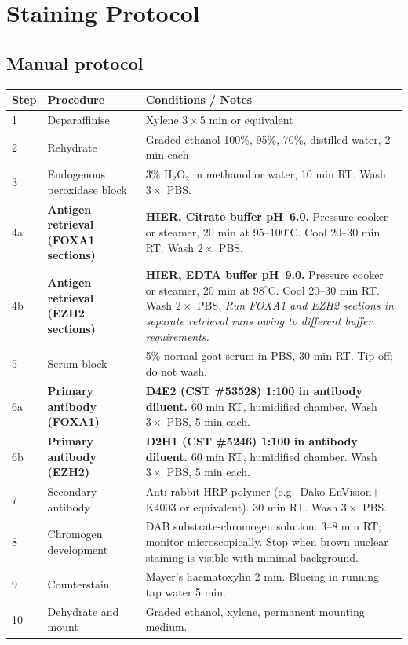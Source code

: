 \documentclass[11pt, a4paper]{article}
\begin{document}
\section{Staining Protocol}

\subsection{Manual protocol}

\begin{center}
\begin{tabular}{p{0.7cm}p{4.8cm}p{8cm}}
\toprule
\textbf{Step} & \textbf{Procedure} &
\textbf{Conditions / Notes} \\
\midrule
1 & Deparaffinise &
Xylene $3\times5$ min or equivalent \\[0.3em]
2 & Rehydrate &
Graded ethanol 100\%, 95\%, 70\%,
distilled water, 2 min each \\[0.3em]
3 & Endogenous peroxidase block &
3\% H$_2$O$_2$ in methanol or water,
10 min RT. Wash $3\times$ PBS. \\[0.3em]
4a & \textbf{Antigen retrieval
(FOXA1 sections)} &
\textbf{HIER, Citrate buffer pH~6.0.}
Pressure cooker or steamer,
20 min at $95$--$100^\circ$C.
Cool 20--30 min RT.
Wash $2\times$ PBS.\\[0.3em]
4b & \textbf{Antigen retrieval
(EZH2 sections)} &
\textbf{HIER, EDTA buffer pH~9.0.}
Pressure cooker or steamer,
20 min at $98^\circ$C.
Cool 20--30 min RT.
Wash $2\times$ PBS.
\textit{Run FOXA1 and EZH2 sections
in separate retrieval runs owing
to different buffer requirements.}\\[0.3em]
5 & Serum block &
5\% normal goat serum in PBS,
30 min RT. Tip off; do not wash.\\[0.3em]
6a & \textbf{Primary antibody
(FOXA1)} &
\textbf{D4E2 (CST \#53528) 1:100
in antibody diluent.}
60 min RT, humidified chamber.
Wash $3\times$ PBS, 5 min each.\\[0.3em]
6b & \textbf{Primary antibody
(EZH2)} &
\textbf{D2H1 (CST \#5246) 1:100
in antibody diluent.}
60 min RT, humidified chamber.
Wash $3\times$ PBS, 5 min each.\\[0.3em]
7 & Secondary antibody &
Anti-rabbit HRP-polymer
(e.g.\ Dako EnVision$+$ K4003
or equivalent).
30 min RT. Wash $3\times$ PBS.\\[0.3em]
8 & Chromogen development &
DAB substrate-chromogen solution.
3--8 min RT; monitor
microscopically. Stop when brown
nuclear staining is visible
with minimal background.\\[0.3em]
9 & Counterstain &
Mayer's haematoxylin 2 min.
Blueing in running tap water
5 min.\\[0.3em]
10 & Dehydrate and mount &
Graded ethanol, xylene,
permanent mounting medium.\\
\bottomrule
\end{tabular}
\end{center}
\end{document}
